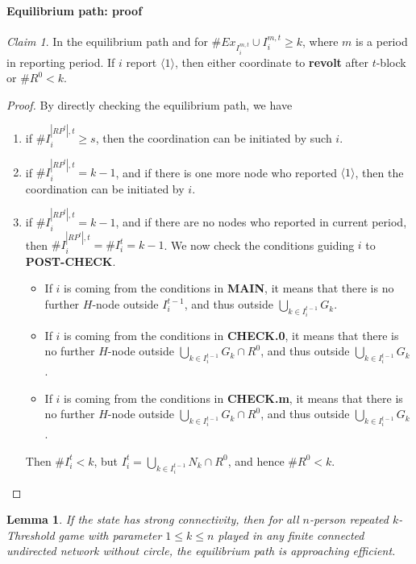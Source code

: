 \documentclass[12pt,letter]{article}
\newtheorem{lemma}{Lemma}[section]
\theoremstyle{definition}
\theoremstyle{remark}
\theoremstyle{claim}
\newtheorem{claim}{Claim}
\begin{document}
\paragraph{Equilibrium path: proof}
\begin{claim}
\label{claim_either_success_or_fail}
In the equilibrium path and for $\#Ex_{I^{m,t}_i}\cup I^{m,t}_i\geq k$, where $m$ is a period in reporting period. If $i$ report $\langle 1 \rangle$, then either coordinate to \textbf{revolt} after $t$-block or $\# R^0<k$.
\end{claim}
\begin{proof}
By directly checking the equilibrium path, we have
\begin{enumerate}
\item if $\# I^{|RP^t|,t}_i\geq s$, then the coordination can be initiated by such $i$.
\item if $\# I^{|RP^t|,t}_i= k-1$, and if there is one more node who reported $\langle 1 \rangle$, then the coordination can be initiated by $i$.
\item if $\# I^{|RP^t|,t}_i= k-1$, and if there are no nodes who reported in current period, then $\# I^{|RP^t|,t}_i=\# I^{t}_i= k-1$. We now check the conditions guiding $i$ to \textbf{POST-CHECK}.
\begin{itemize}
\item If $i$ is coming from the conditions in \textbf{MAIN}, it means that there is no further $H$-node outside $I^{t-1}_i$, and thus outside $\bigcup_{k\in I^{t-1}_i}G_k$.
\item If $i$ is coming from the conditions in \textbf{CHECK.0}, it means that there is no further $H$-node outside $\bigcup_{k\in I^{t-1}_i}G_k\cap R^0$, and thus outside $\bigcup_{k\in I^{t-1}_i}G_k$. 
\item If $i$ is coming from the conditions in \textbf{CHECK.m}, it means that there is no further $H$-node outside $\bigcup_{k\in I^{t-1}_i}G_k\cap R^0$, and thus outside $\bigcup_{k\in I^{t-1}_i}G_k$. 
\end{itemize}
Then $\# I^{t}_i< k$, but $I^t_i=\bigcup_{k\in I^{t-1}_i}N_k\cap R^0$, and hence $\# R^0<k$.

\end{enumerate}


\end{proof}



\begin{lemma}
If the state has strong connectivity, then for all $n$-person repeated $k$-Threshold game with parameter $1\leq k\leq n$ played in any finite connected undirected network without circle, the equilibrium path is approaching efficient.
\end{lemma}
\end{document}
